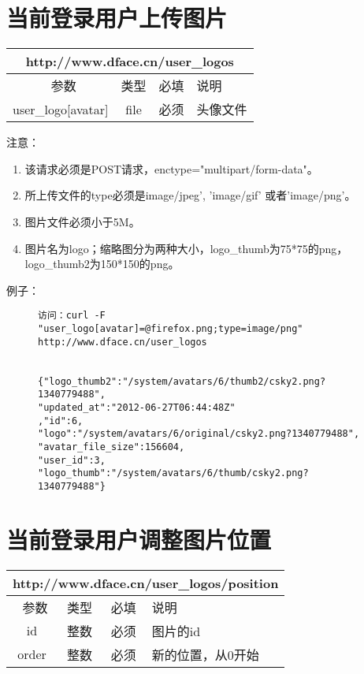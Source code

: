 \documentclass[cs4size]{ctexartutf8}
\begin{document}
\section{当前登录用户上传图片}

\begin{table}[H]
   \begin{center}
\begin{tabular}{|c|c|c|p{12cm}|}
\hline
\multicolumn{4}{|c|}{http://www.dface.cn/user\_logos} \\
\hline\hline
 \  参数  & 类型 & 必填 &  说明  \\
\hline
 user\_logo[avatar]  & file & 必须 &  头像文件\\
\hline
\end{tabular}
   \end{center}
\end{table}

注意：

\begin{enumerate}
\item 该请求必须是POST请求，enctype="multipart/form-data"。
\item 所上传文件的type必须是image/jpeg', 'image/gif' 或者'image/png'。
\item 图片文件必须小于5M。
\item 图片名为logo；缩略图分为两种大小，logo\_thumb为75*75的png，logo\_thumb2为150*150的png。
\end{enumerate}

例子：

\begin{figure}[H]
\begin{verbatim}
访问：curl -F "user_logo[avatar]=@firefox.png;type=image/png" 
http://www.dface.cn/user_logos


{"logo_thumb2":"/system/avatars/6/thumb2/csky2.png?1340779488",
"updated_at":"2012-06-27T06:44:48Z"
,"id":6,
"logo":"/system/avatars/6/original/csky2.png?1340779488",
"avatar_file_size":156604,
"user_id":3,
"logo_thumb":"/system/avatars/6/thumb/csky2.png?1340779488"}

\end{verbatim}
\end{figure}



\section{当前登录用户调整图片位置}

\begin{table}[H]
   \begin{center}
\begin{tabular}{|c|c|c|p{12cm}|}
\hline
\multicolumn{4}{|c|}{http://www.dface.cn/user\_logos/position} \\
\hline\hline
 \  参数  & 类型 & 必填 &  说明  \\
\hline
 id  & 整数 & 必须 &  图片的id\\
 \hline
 order  & 整数 & 必须 &  新的位置，从0开始\\
\hline
\end{tabular}
   \end{center}
\end{table}
\end{document}

